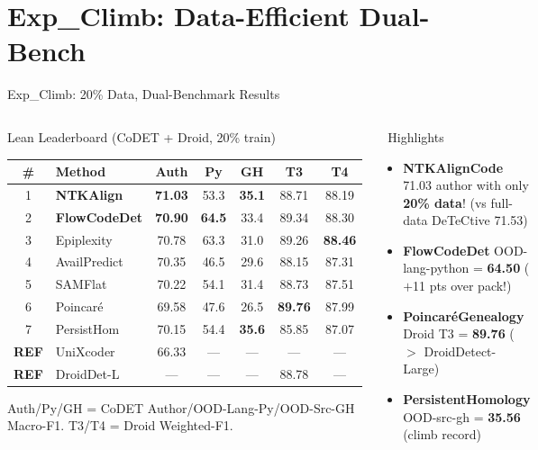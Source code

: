\documentclass[aspectratio=169, 10pt]{beamer}
\begin{document}
\section{Exp\_Climb: Data-Efficient Dual-Bench}

\begin{frame}{Exp\_Climb: 20\% Data, Dual-Benchmark Results}
\vspace{-0.25cm}
\begin{columns}[T]
\begin{block}{Lean Leaderboard (CoDET + Droid, 20\% train)}
\centering\scriptsize
\begin{tabular}{clccccc}
\toprule
\textbf{\#} & \textbf{Method} & \textbf{Auth} & \textbf{Py} & \textbf{GH} & \textbf{T3} & \textbf{T4} \\
\midrule
\rowcolor{oursgreen}
1 & \textbf{NTKAlign} & \textbf{71.03} & 53.3 & \textbf{35.1} & 88.71 & 88.19 \\
\rowcolor{oursgreen}
2 & \textbf{FlowCodeDet} & \textbf{70.90} & \textbf{64.5} & 33.4 & 89.34 & 88.30 \\
3 & Epiplexity & 70.78 & 63.3 & 31.0 & 89.26 & \textbf{88.46} \\
4 & AvailPredict & 70.35 & 46.5 & 29.6 & 88.15 & 87.31 \\
5 & SAMFlat & 70.22 & 54.1 & 31.4 & 88.73 & 87.51 \\
\midrule
6 & Poincar\'{e} & 69.58 & 47.6 & 26.5 & \textbf{89.76} & 87.99 \\
7 & PersistHom & 70.15 & 54.4 & \textbf{35.6} & 85.85 & 87.07 \\
\midrule
\textbf{REF} & UniXcoder & 66.33 & --- & --- & --- & --- \\
\textbf{REF} & DroidDet-L & --- & --- & --- & 88.78 & --- \\
\bottomrule
\end{tabular}

{\tiny Auth/Py/GH = CoDET Author/OOD-Lang-Py/OOD-Src-GH Macro-F1. T3/T4 = Droid Weighted-F1.}
\end{block}

\begin{exampleblock}{\faLightbulb\ Highlights}
\small
\begin{itemize}\setlength\itemsep{3pt}
    \item[\ding{51}] \textbf{NTKAlignCode} 71.03 author with only \textbf{20\% data}! (vs full-data DeTeCtive 71.53)
    \item[\ding{51}] \textbf{FlowCodeDet} OOD-lang-python = \textbf{64.50} ($+$11 pts over pack!)
    \item[\ding{51}] \textbf{Poincar\'{e}Genealogy} Droid T3 = \textbf{89.76} (\textcolor{softgreen}{$>$ DroidDetect-Large})
    \item[\ding{51}] \textbf{PersistentHomology} OOD-src-gh = \textbf{35.56} (climb record)
\end{itemize}
\end{exampleblock}


\end{columns}
\end{frame}
\end{document}
